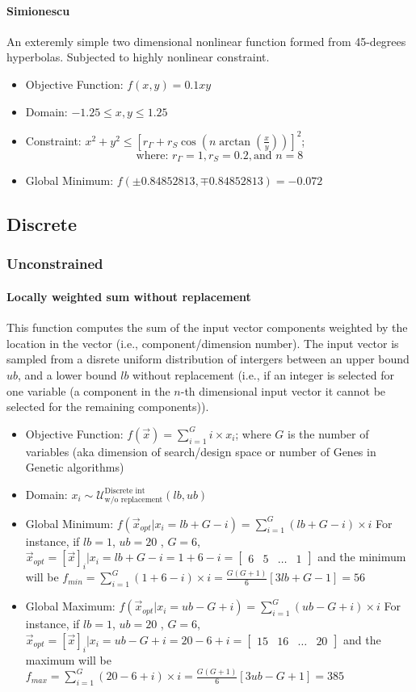 \paragraph{Simionescu}
An exteremly simple two dimensional nonlinear function formed from 45-degrees hyperbolas. Subjected to highly nonlinear constraint.
\begin{itemize}
	\item Objective Function: $f(x,y) = 0.1xy$
	\item Domain: $-1.25 \leq x,y \leq 1.25$
	\item Constraint: $x^2 + y^2 \leq \left[r_{\Gamma}+r_S\cos\left(n \arctan(\frac{x}{y})\right)\right]^2 $; \[ \text{where: } r_{\Gamma}=1, r_S = 0.2, \text{and } n=8 \]
	\item Global Minimum: $f(\pm 0.84852813,\mp0.84852813) = -0.072$
\end{itemize}
\subsection{Discrete}
\subsubsection{Unconstrained}
\paragraph{Locally weighted sum without replacement}
This function computes the sum of the input vector components weighted by the location in the vector (i.e., component/dimension number). The input vector is sampled from a disrete uniform distribution of intergers between an upper bound $ub$, and a lower bound $lb$ without replacement (i.e., if an integer is selected for one variable (a component in the $n$-th dimensional input vector it cannot be selected for the remaining components)).
\begin{itemize}
	\item Objective Function: $f(\vec{x}) = \sum_{i=1}^{G}i \times x_i$; where $G$ is the number of variables (aka dimension of search/design space or number of Genes in Genetic algorithms) 
	\item Domain: $x_i \sim \mathcal{U}^{\text{Discrete int}}_{\text{w/o replacement}} (lb,ub)$
	\item Global Minimum: $f(\vec{x}_{opt}|x_i = lb + G - i) = \sum_{i=1}^{G} (lb + G -i) \times i$
	For instance, if $lb =1$, $ub=20$ , $G=6$, $\vec{x}_{opt} = [\vec{x}]_i | x_i = lb + G - i = 1+6-i = \begin{bmatrix}
	6 & 5 & \dots & 1 \end{bmatrix}$ and the minimum will be $f_{min} = \sum_{i=1}^{G} (1 + 6 -i) \times i = \frac{G(G+1)}{6}[3lb+G-1] = 56$
	\item Global Maximum: $f(\vec{x}_{opt}|x_i = ub - G + i) = \sum_{i=1}^{G} (ub - G +i) \times i$
	For instance, if $lb =1$, $ub=20$ , $G=6$, $\vec{x}_{opt} = [\vec{x}]_i | x_i = ub - G + i = 20-6+i = \begin{bmatrix}
	15 & 16 & \dots & 20 \end{bmatrix}$ and the maximum will be $f_{max} = \sum_{i=1}^{G} (20 - 6 +i) \times i = \frac{G(G+1)}{6}[3ub-G+1] = 385$
\end{itemize}

